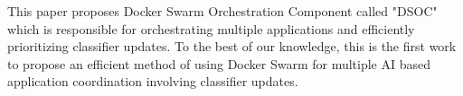 This paper proposes Docker Swarm Orchestration Component called "DSOC" which is responsible for orchestrating multiple applications and efficiently prioritizing classifier updates. To the best of our knowledge, this is the first work to propose an efficient method of using Docker Swarm for multiple AI based application coordination involving classifier updates. 



